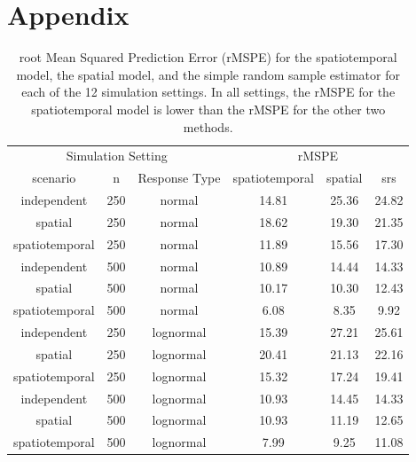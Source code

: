 \documentclass[]{interact}
\theoremstyle{plain}%
\theoremstyle{definition}
\theoremstyle{remark}
\begin{document}
\section{Appendix} \label{section:appendix}

\begin{table}[H]

\caption{\label{tab:simrmspetab}root Mean Squared Prediction Error (rMSPE) for the spatiotemporal model, the spatial model, and the simple random sample estimator for each of the 12 simulation settings. In all settings, the rMSPE for the spatiotemporal model is lower than the rMSPE for the other two methods.}
\centering
\begin{tabular}[t]{cccccc}
\toprule
\multicolumn{3}{c}{Simulation Setting} & \multicolumn{3}{c}{rMSPE} \\
\cmidrule(l{3pt}r{3pt}){1-3} \cmidrule(l{3pt}r{3pt}){4-6}
scenario & n & Response Type & spatiotemporal & spatial & srs\\
\midrule
independent & 250 & normal & 14.81 & 25.36 & 24.82\\
spatial & 250 & normal & 18.62 & 19.30 & 21.35\\
spatiotemporal & 250 & normal & 11.89 & 15.56 & 17.30\\
\midrule
independent & 500 & normal & 10.89 & 14.44 & 14.33\\
spatial & 500 & normal & 10.17 & 10.30 & 12.43\\
spatiotemporal & 500 & normal & 6.08 & 8.35 & 9.92\\
\midrule
independent & 250 & lognormal & 15.39 & 27.21 & 25.61\\
spatial & 250 & lognormal & 20.41 & 21.13 & 22.16\\
spatiotemporal & 250 & lognormal & 15.32 & 17.24 & 19.41\\
\midrule
independent & 500 & lognormal & 10.93 & 14.45 & 14.33\\
spatial & 500 & lognormal & 10.93 & 11.19 & 12.65\\
spatiotemporal & 500 & lognormal & 7.99 & 9.25 & 11.08\\
\bottomrule
\end{tabular}
\end{table}
\end{document}
